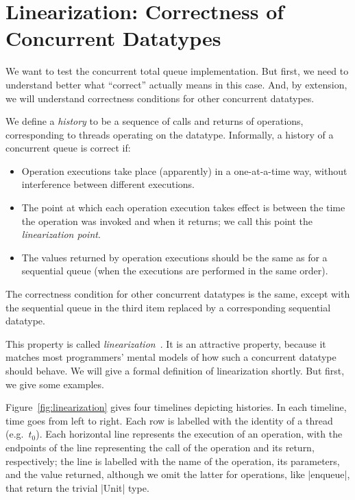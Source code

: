 \section{Linearization: Correctness of Concurrent Datatypes}
\label{sec:linearization}

We want to test the concurrent total queue implementation.  But first, we need
to understand better what ``correct'' actually means in this case.  And, by
extension, we will understand correctness conditions for other concurrent
datatypes. 

We define a \emph{history} to be a sequence of calls and returns of
operations, corresponding to threads operating on the datatype.
Informally, a history of a concurrent queue is correct if:
%
\begin{itemize}
\item Operation executions take place (apparently) in a one-at-a-time
  way, without interference between different executions.

\item The point at which each operation execution takes effect is between the
time the operation was invoked and when it returns; we call this point
the \emph{linearization point}.

\item The values returned by operation executions should be the same as for a
sequential queue (when the executions are performed in the same order).
\end{itemize}
%
The correctness condition for other concurrent datatypes is the same, except
with the sequential queue in the third item replaced by a corresponding
sequential datatype.

This property is called \emph{linearization}~\cite{herlihy-wing}.  It is an
attractive property, because it matches most programmers' mental models of how
such a concurrent datatype should behave.
%
We will give a formal definition of linearization shortly.  But first, we
give some examples.  

Figure~\ref{fig:linearization} gives four timelines depicting histories.  In
each timeline, time goes from left to right.  Each row is labelled with the
identity of a thread (e.g.~$t_0$).  Each horizontal line represents the
execution of an operation, with the endpoints of the line representing the
call of the operation and its return, respectively; the line is labelled with
the name of the operation, its parameters, and the value returned, although we
omit the latter for operations, like |enqueue|, that return the trivial |Unit|
type.

